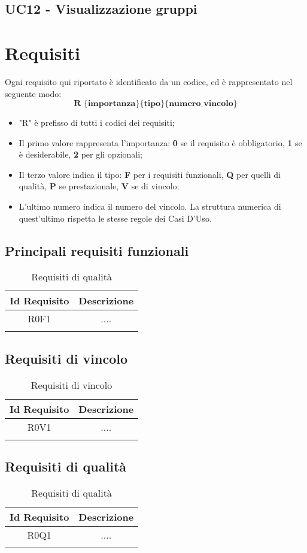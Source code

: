 \subsection{UC12 - Visualizzazione gruppi}


\section{Requisiti}
Ogni requisito qui riportato è identificato da un codice, ed è rappresentato nel seguente modo:
$$ \textbf{R \{importanza\}\{tipo\}\{numero\_vincolo\} } $$

\begin{itemize}
	\item "R" è prefisso di tutti i codici dei requisiti;
	\item Il primo valore rappresenta l'importanza: \textbf{0} se il requisito è obbligatorio, \textbf{1} se è desiderabile, \textbf{2} per gli opzionali;
	\item Il terzo valore indica il tipo: \textbf{F} per i requisiti funzionali, \textbf{Q} per quelli di qualità, \textbf{P} se prestazionale, \textbf{V} se di vincolo;
	\item L'ultimo numero indica il numero del vincolo. La struttura numerica di quest'ultimo rispetta le stesse regole dei Casi D'Uso.
\end{itemize}

\subsection{Principali requisiti funzionali}
\begin{longtable}{|c|c|}
	\hline
	\textbf{Id Requisito} & \textbf{Descrizione}\\
	\hline
	\endhead
	R0F1 & ....  \\ \hline 
	\caption{Requisiti di qualità}
	\label{tabella:req}
\end{longtable}

\subsection{Requisiti di vincolo}
\begin{longtable}{|c|c|}
	\hline
	\textbf{Id Requisito} & \textbf{Descrizione}\\
	\hline
	\endhead
	R0V1 & ....  \\ \hline 
	\caption{Requisiti di vincolo}
	\label{tabella:reqV}
\end{longtable}

\subsection{Requisiti di qualità}
\begin{longtable}{|c|c|}
	\hline
	\textbf{Id Requisito} & \textbf{Descrizione}\\
	\hline
	\endhead
	R0Q1 & ....  \\ \hline 
	\caption{Requisiti di qualità}
	\label{tabella:reqQ}
\end{longtable}

